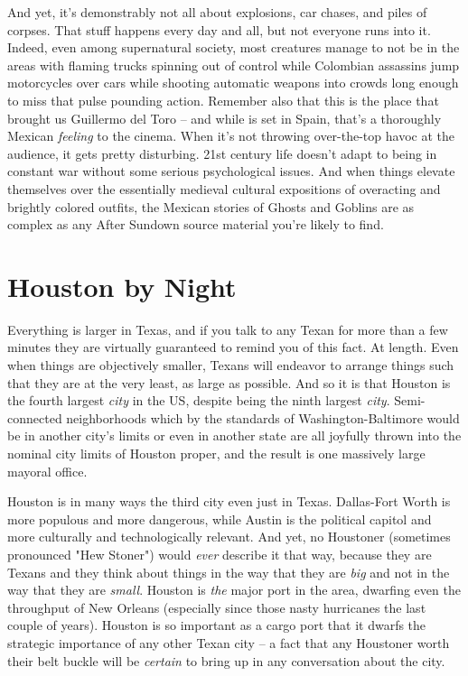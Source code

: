 And yet, it's demonstrably not all about explosions, car chases, and piles of corpses. That stuff happens every day and all, but not everyone runs into it. Indeed, even among supernatural society, most creatures manage to not be in the areas with flaming trucks spinning out of control while Colombian assassins jump motorcycles over cars while shooting automatic weapons into crowds long enough to miss that pulse pounding action. Remember also that this is the place that brought us Guillermo del Toro -- and while  is set in Spain, that's a thoroughly Mexican \textit{feeling} to the cinema. When it's not throwing over-the-top havoc at the audience, it gets pretty disturbing. 21st century life doesn't adapt to being in constant war without some serious psychological issues. And when things elevate themselves over the essentially medieval cultural expositions of overacting and brightly colored outfits, the Mexican stories of Ghosts and Goblins are as complex as any After Sundown source material you're likely to find.

\section{Houston by Night}

Everything is larger in Texas, and if you talk to any Texan for more than a few minutes they are virtually guaranteed to remind you of this fact. At length. Even when things are objectively smaller, Texans will endeavor to arrange things such that they are at the very least, as large as possible. And so it is that Houston is the fourth largest \textit{city} in the US, despite being the ninth largest \textit{city}. Semi-connected neighborhoods which by the standards of Washington-Baltimore would be in another city's limits or even in another state are all joyfully thrown into the nominal city limits of Houston proper, and the result is one massively large mayoral office.

Houston is in many ways the third city even just in Texas. Dallas-Fort Worth is more populous and more dangerous, while Austin is the political capitol and more culturally and technologically relevant. And yet, no Houstoner (sometimes pronounced "Hew Stoner") would \textit{ever} describe it that way, because they are Texans and they think about things in the way that they are \textit{big} and not in the way that they are \textit{small}. Houston is \textit{the} major port in the area, dwarfing even the throughput of New Orleans (especially since those nasty hurricanes the last couple of years). Houston is so important as a cargo port that it dwarfs the strategic importance of any other Texan city -- a fact that any Houstoner worth their belt buckle will be \textit{certain} to bring up in any conversation about the city.

